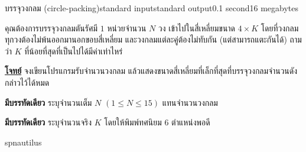 \documentclass[11pt,a4paper]{article}
\begin{document}
\begin{problem}{บรรจุวงกลม (circle-packing)}{standard input}{standard output}{0.1 second}{16 megabytes}

คุณต้องการบรรจุวงกลมตันรัศมี $1$ หน่วยจำนวน $N$ วง เข้าไปในสี่เหลี่ยมขนาด $4 \times K$ โดยที่วงกลมทุกวงต้องไม่พ้นออกมานอกขอบสี่เหลี่ยม และวงกลมแต่ละคู่ต้องไม่ทับกัน (แต่สามารถแตะกันได้) ถามว่า $K$ ที่น้อยที่สุดที่เป็นไปได้มีค่าเท่าไหร่


\underline{\textbf{โจทย์}} จงเขียนโปรแกรมรับจำนวนวงกลม แล้วแสดงขนาดสี่เหลี่ยมที่เล็กที่สุดที่บรรจุวงกลมจำนวนดังกล่าวไว้ได้หมด

\InputFile
 \textbf{มีบรรทัดเดียว} ระบุจำนวนเต็ม $N$ $(1 \leq N \leq 15)$ แทนจำนวนวงกลม

\OutputFile

\textbf{มีบรรทัดเดียว} ระบุจำนวนจริง $K$ โดยให้พิมพ์ทศนิยม $6$ ตำแหน่งพอดี

\Examples

\begin{example}
%
%
\end{example}

\Source

spnautilus

\end{problem}
\end{document}
